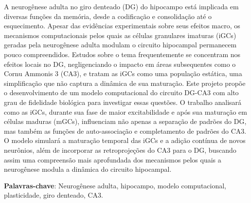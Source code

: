 \setlength{\absparsep}{18pt} %

\begin{resumo}

A neurogênese adulta no giro denteado (DG) do hipocampo está implicada em diversas funções da memória, desde a codificação e
consolidação até o esquecimento. Apesar das evidências experimentais sobre seus efeitos macro, os mecanismos computacionais pelos
quais as células granulares imaturas (iGCs) geradas pela neurogênese adulta modulam o circuito hipocampal permanecem pouco
compreendidos. Estudos sobre o tema frequentemente se concentram nos efeitos locais no DG, negligenciando o impacto em áreas
subsequentes como o Cornu Ammonis 3 (CA3), e tratam as iGCs como uma população estática, uma simplificação que não captura a
dinâmica de sua maturação. Este projeto propõe o desenvolvimento de um modelo computacional do circuito DG-CA3 com alto grau de
fidelidade biológica para investigar essas questões. O trabalho analisará como as iGCs, durante sua fase de maior excitabilidade e
após sua maturação em células maduras (mGCs), influenciam não apenas a separação de padrões do DG, mas também as funções de
auto-associação e completamento de padrões do CA3. O modelo simulará a maturação temporal das iGCs e a adição contínua de novos
neurônios, além de incorporar as retroprojeções do CA3 para o DG, buscando assim uma compreensão mais aprofundada dos mecanismos
pelos quais a neurogênese modula a dinâmica do circuito hipocampal.

\noindent\textbf{Palavras-chave}: Neurogênese adulta, hipocampo, modelo computacional, plasticidade, giro denteado, CA3.
\end{resumo}

   



